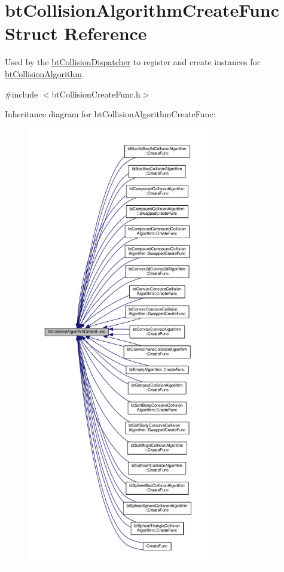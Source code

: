 \hypertarget{structbtCollisionAlgorithmCreateFunc}{}\section{bt\+Collision\+Algorithm\+Create\+Func Struct Reference}
\label{structbtCollisionAlgorithmCreateFunc}


Used by the \hyperlink{classbtCollisionDispatcher}{bt\+Collision\+Dispatcher} to register and create instances for \hyperlink{classbtCollisionAlgorithm}{bt\+Collision\+Algorithm}.  




{\ttfamily \#include $<$bt\+Collision\+Create\+Func.\+h$>$}



Inheritance diagram for bt\+Collision\+Algorithm\+Create\+Func\+:
\nopagebreak
\begin{figure}[H]
\begin{center}
\leavevmode
\includegraphics[height=550pt]{structbtCollisionAlgorithmCreateFunc__inherit__graph}
\end{center}
\end{figure}
